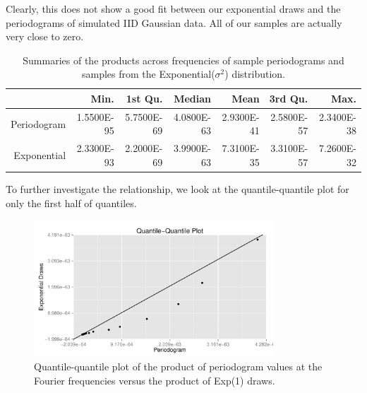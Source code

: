 \documentclass{article}\usepackage[]{graphicx}\usepackage[]{color}
\newenvironment{knitrout}{}{} %
\theoremstyle{plain}
\begin{document}
Clearly, this does not show a good fit between our exponential draws and the periodograms of simulated IID Gaussian data. All of our samples are actually very close to zero.
\begin{table}[H]
\centering
\begin{tabular}{rrrrrrr}
  \hline
 & Min. & 1st Qu. & Median & Mean & 3rd Qu. & Max. \\ 
  \hline
Periodogram & 1.5500E-95 & 5.7500E-69 & 4.0800E-63 & 2.9300E-41 & 2.5800E-57 & 2.3400E-38 \\ 
  Exponential & 2.3300E-93 & 2.2000E-69 & 3.9900E-63 & 7.3100E-35 & 3.3100E-57 & 7.2600E-32 \\ 
   \hline
\end{tabular}
\caption{Summaries of the products across frequencies of sample periodograms and samples from the Exponential($\sigma^2$) distribution.} 
\end{table}


To further investigate the relationship, we look at the quantile-quantile plot for only the first half of quantiles.
\begin{knitrout}
\color{fgcolor}\begin{figure}[H]


{\centering \includegraphics[width=0.8\textwidth]{figure/qqplot2} 

}

\caption[Quantile-quantile plot of the product of periodogram values at the Fourier frequencies versus the product of Exp(1) draws]{Quantile-quantile plot of the product of periodogram values at the Fourier frequencies versus the product of Exp(1) draws.\label{fig:qqplot2}}
\end{figure}


\end{knitrout}
\end{document}

